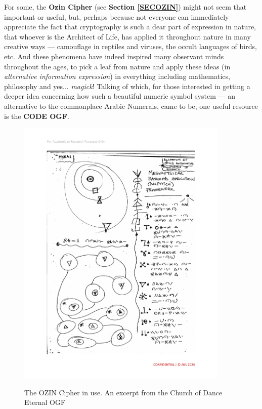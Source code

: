 \documentclass[a4paper, 18pt]{book} %
\begin{document}
\begin{appendices}
For some, the \textbf{Ozin Cipher}\cite{lutalo_2025_ozin} (see \textbf{Section \ref{SECOZIN}}) might not seem that important or useful, but, perhaps because not everyone can immediately appreciate the fact that cryptography is such a dear part of expression in nature, that whoever is the Architect of Life, has applied it throughout nature in many creative ways --- camouflage in reptiles and viruses, the occult languages of birds, etc. And these phenomena have indeed inspired many observant minds throughout the ages, to pick a leaf from nature and apply these ideas (in \textit{alternative information expression}) in everything including mathematics, philosophy and yes... \textit{magick}! Talking of which, for those interested in getting a deeper idea concerning how such a beautiful numeric symbol system --- an alternative to the commonplace Arabic Numerals, came to be, one useful resource is the \textbf{CODE OGF}\cite{lutalo_2025_ogf}.

\begin{figure}[H]
  \begin{center}
   \includegraphics[trim=0cm 2cm 0cm 0cm, clip, width=0.9\textwidth,]{resources/pdfs/ozin.pdf}\\
   \caption{The OZIN Cipher in use. An excerpt from the Church of Dance Eternal OGF}
  \label{FIGCODEOZIN}
  \end{center}
\end{figure}


\end{appendices}
\end{document}
